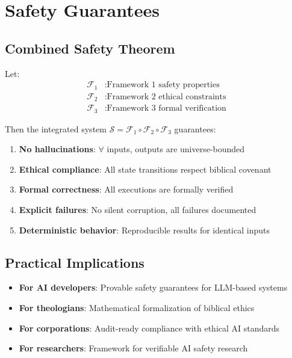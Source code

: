 \documentclass[12pt]{article}
\begin{document}
\section{Safety Guarantees}

\subsection{Combined Safety Theorem}

\begin{theorem}
Let:
\begin{align*}
    \mathcal{F}_1 & : \text{Framework 1 safety properties} \\
    \mathcal{F}_2 & : \text{Framework 2 ethical constraints} \\
    \mathcal{F}_3 & : \text{Framework 3 formal verification}
\end{align*}

Then the integrated system $\mathcal{S} = \mathcal{F}_1 \circ \mathcal{F}_2 \circ \mathcal{F}_3$ guarantees:
\begin{enumerate}
    \item \textbf{No hallucinations}: $\forall$ inputs, outputs are universe-bounded
    \item \textbf{Ethical compliance}: All state transitions respect biblical covenant
    \item \textbf{Formal correctness}: All executions are formally verified
    \item \textbf{Explicit failures}: No silent corruption, all failures documented
    \item \textbf{Deterministic behavior}: Reproducible results for identical inputs
\end{enumerate}
\end{theorem}

\subsection{Practical Implications}

\begin{itemize}
    \item \textbf{For AI developers}: Provable safety guarantees for LLM-based systems
    \item \textbf{For theologians}: Mathematical formalization of biblical ethics
    \item \textbf{For corporations}: Audit-ready compliance with ethical AI standards
    \item \textbf{For researchers}: Framework for verifiable AI safety research
\end{itemize}
\end{document}
